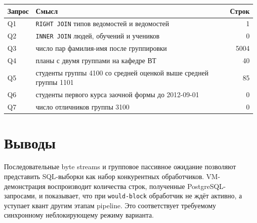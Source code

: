 \documentclass[a4paper,12pt]{article}
\begin{document}
\begin{center}
\begin{tabular}{|l|p{9cm}|r|}
\hline
Запрос & Смысл & Строк \\
\hline
Q1 & \texttt{RIGHT JOIN} типов ведомостей и ведомостей & 1 \\
Q2 & \texttt{INNER JOIN} людей, обучений и учеников & 0 \\
Q3 & число пар фамилия-имя после группировки & 5004 \\
Q4 & планы с двумя группами на кафедре ВТ & 40 \\
Q5 & студенты группы 4100 со средней оценкой выше средней группы 1101 & 85 \\
Q6 & студенты первого курса заочной формы до 2012-09-01 & 0 \\
Q7 & число отличников группы 3100 & 0 \\
\hline
\end{tabular}
\end{center}

\section{Выводы}
Последовательные byte streams и групповое пассивное ожидание позволяют представить SQL-выборки как набор конкурентных обработчиков. VM-демонстрация воспроизводит количества строк, полученные PostgreSQL-запросами, и показывает, что при \texttt{would-block} обработчик не ждёт активно, а уступает квант другим этапам pipeline. Это соответствует требуемому синхронному неблокирующему режиму варианта.
\end{document}
